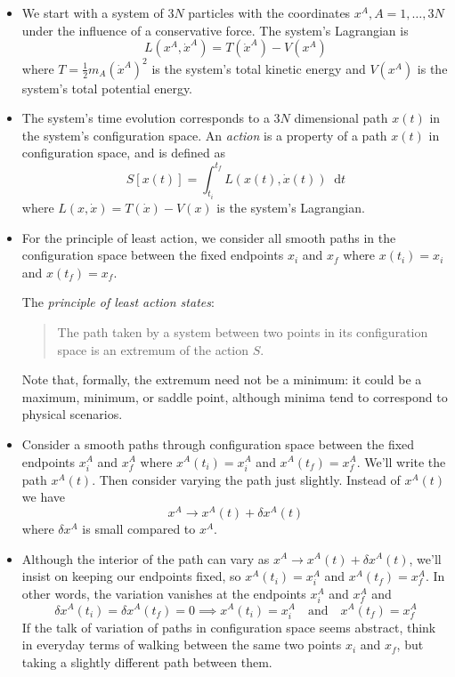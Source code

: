 \documentclass[11pt, a4paper]{article}
\newcommand{\diff}{\mathop{}\!\mathrm{d}} %
\begin{document}
\begin{itemize}
	\item We start with a system of $ 3N $ particles with the coordinates $ x^{A}, A = 1, \ldots, 3N $ under the influence of a conservative force. The system's Lagrangian is
	\begin{equation*}
		L(x^{A}, \dot{x}^{A}) = T(\dot{x}^{A}) - V(x^{A})
	\end{equation*}
	where $ T = \frac{1}{2}m_{A}(\dot{x}^{A})^{2}$ is the system's total kinetic energy and $ V(x^{A}) $ is the system's total potential energy. 
	
	\item The system's time evolution corresponds to a $ 3N $ dimensional path $ x(t) $ in the system's configuration space. An \textit{action} is a property of a path $ x(t) $ in configuration space, and is defined as
	\begin{equation*}
		S[x(t)] = \int_{t_i}^{t_f} L(x(t), \dot{x}(t)) \diff t
	\end{equation*}
	where $ L(x, \dot x) = T(\dot{x}) - V(x) $ is the system's Lagrangian. 
	

	
	\item For the principle of least action, we consider all smooth paths in the configuration space between the fixed endpoints $ x_{i}$ and $ x_{f} $ where $ x(t_i) = x_i $ and $ x(t_f) = x_{f} $.
	
	The \textit{principle of least action states}: 
	\begin{quote}
		The path taken by a system between two points in its configuration space is an extremum of the action $ S $.
	\end{quote}
	Note that, formally, the extremum need not be a minimum: it could be a maximum, minimum, or saddle point, although minima tend to correspond to physical scenarios.
	

	\item Consider a smooth paths through configuration space between the fixed endpoints $ x^{A}_{i}$ and $ x^{A}_{f} $ where $ x^{A}(t_i) = x^{A}_i $ and $ x^{A}(t_f) = x^{A}_{f} $. We'll write the path $ x^{A}(t) $. Then consider varying the path just slightly. Instead of $ x^{A}(t) $ we have
	\begin{equation*}
		x^{A} \to x^{A}(t) + \delta x^{A}(t)
	\end{equation*}
	where $ \delta x^{A} $ is small compared to $ x^{A} $. 
	
	\item Although the interior of the path can vary as $ x^{A} \to x^{A}(t) + \delta x^{A}(t) $, we'll insist on keeping our endpoints fixed, so $ x^{A}(t_i) = x^{A}_i $ and $ x^{A}(t_f) = x^{A}_{f} $. In other words, the variation vanishes at the endpoints $ x^{A}_{i} $ and $ x^{A}_{f} $ and
	\begin{equation*}
		\delta x^{A}(t_{i}) = \delta x^{A}(t_{f}) = 0 \implies x^{A}(t_{i}) = x^{A}_{i} \quad \text{and} \quad x^{A}(t_{f}) = x^{A}_{f}
	\end{equation*}
	If the talk of variation of paths in configuration space seems abstract, think in everyday terms of walking between the same two points $ x_{i} $ and $ x_{f} $, but taking a slightly different path between them. 
	

\end{itemize}
\end{document}
